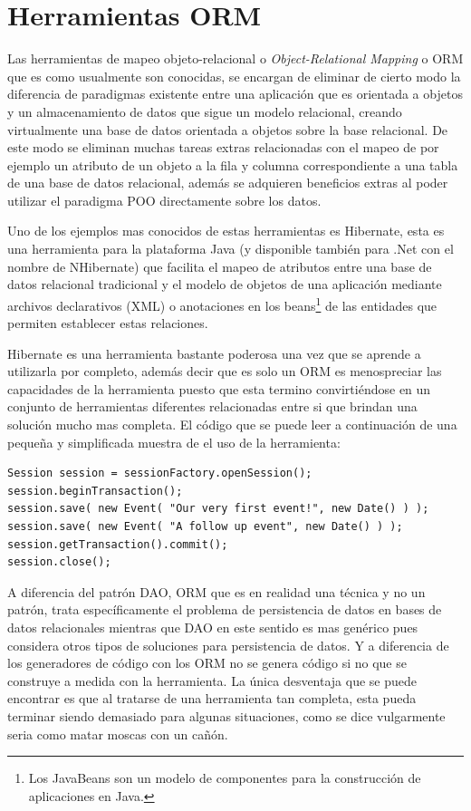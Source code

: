 \section{Herramientas ORM}
%
Las herramientas de mapeo objeto-relacional o \textit{Object-Relational Mapping} o ORM que es como usualmente son conocidas, se encargan de eliminar de cierto modo la diferencia de paradigmas existente entre una aplicación que es orientada a objetos y un almacenamiento de datos que sigue un modelo relacional, creando virtualmente una base de datos orientada a objetos sobre la base relacional. De este modo se eliminan muchas tareas extras relacionadas con el mapeo de por ejemplo un atributo de un objeto a la fila y columna correspondiente a una tabla de una base de datos relacional, además se adquieren beneficios extras al poder utilizar el paradigma POO directamente sobre los datos.

Uno de los ejemplos mas conocidos de estas herramientas es Hibernate, esta es una herramienta para la plataforma Java (y disponible también para .Net con el nombre de NHibernate) que facilita el mapeo de atributos entre una base de datos relacional tradicional y el modelo de objetos de una aplicación mediante archivos declarativos (XML) o anotaciones en los beans\footnote{Los JavaBeans son un modelo de componentes para la construcción de aplicaciones en Java.} de las entidades que permiten establecer estas relaciones. 

Hibernate es una herramienta bastante poderosa una vez que se aprende a utilizarla por completo, además decir que es solo un ORM es menospreciar las capacidades de la herramienta puesto que esta termino convirtiéndose en un conjunto de herramientas diferentes relacionadas entre si que brindan una solución mucho mas completa. El código que se puede leer a continuación de una pequeña y simplificada muestra de el uso de la herramienta:
\begin{lstlisting}[title=Minimo ejemplo de Hibernate: guardando datos en la DB]
Session session = sessionFactory.openSession();
session.beginTransaction();
session.save( new Event( "Our very first event!", new Date() ) );
session.save( new Event( "A follow up event", new Date() ) );
session.getTransaction().commit();
session.close();
\end{lstlisting}
A diferencia del patrón DAO, ORM que es en realidad una técnica y no un patrón, trata específicamente el problema de persistencia de datos en bases de datos relacionales mientras que DAO en este sentido es mas genérico pues considera otros tipos de soluciones para persistencia de datos. Y a diferencia de los generadores de código con los ORM no se genera código si no que se construye a medida con la herramienta. La única desventaja que se puede encontrar es que al tratarse de una herramienta tan completa, esta pueda terminar siendo demasiado para algunas situaciones, como se dice vulgarmente seria como matar moscas con un cañón.
%
